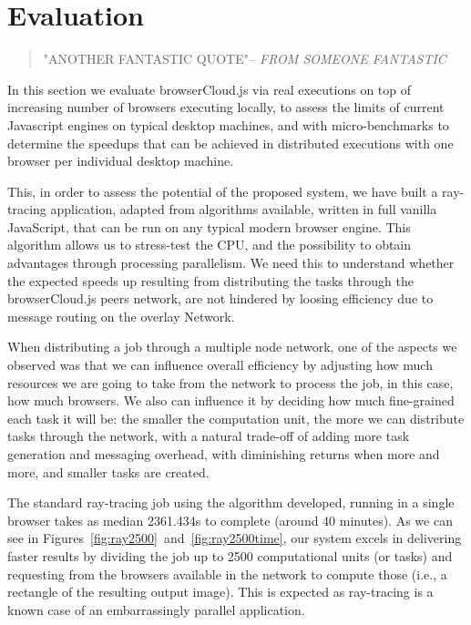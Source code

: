 \chapter{Evaluation}\label{ch:evaluation}

\begin{quotation}
  {\small\it }"ANOTHER FANTASTIC QUOTE"{\small\it -- FROM SOMEONE FANTASTIC }
\end{quotation}


In this section we evaluate browserCloud.js via real executions on top of increasing number of browsers executing locally, to assess the limits of current Javascript engines on typical desktop machines, and with micro-benchmarks to determine the speedups that can be achieved in distributed executions with one browser per individual desktop machine.

This, in order to assess the potential of the proposed system, we have built a ray-tracing application, adapted from algorithms available, written in full vanilla JavaScript, that can be run on any  typical modern browser engine. This algorithm allows us to stress-test the CPU,  and the possibility to obtain advantages through processing parallelism. We need this to understand whether the expected speeds up resulting from distributing the tasks through the browserCloud.js peers network, are not hindered by loosing efficiency due to message routing on the overlay Network.

When distributing a job through a multiple node network, one of the aspects we observed was that we can influence overall efficiency by adjusting how much resources we are going to take from the network to process the job, in this case, how much browsers. We also can influence it by deciding how much fine-grained each task it will be: the smaller the computation unit, the more we can distribute tasks through the network, with a natural trade-off of adding more task generation and messaging overhead, with diminishing returns when more and more, and  smaller tasks are created.

The standard ray-tracing job using the algorithm developed, running in a single browser takes as median 2361.434s to complete (around 40 minutes). As we can see in Figures~\ref{fig:ray2500}~and~\ref{fig:ray2500time}, our system excels in delivering faster results by dividing the job up to 2500 computational units (or tasks) and requesting from the browsers available in the network to compute those (i.e., a rectangle of the resulting output image). This is expected as ray-tracing is a known case of an embarrassingly parallel application.

